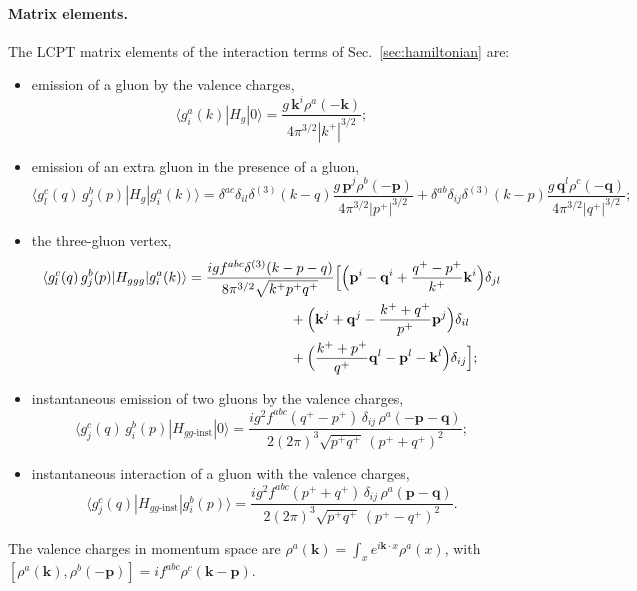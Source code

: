 \documentclass[aps,prd,onecolumn,superscriptaddress,nofootinbib,floatfix,longbibliography,11pt]{revtex4-2}
\numberwithin{equation}{section}
\begin{document}
\paragraph*{Matrix elements.} The LCPT matrix elements of the interaction terms of Sec.~\ref{sec:hamiltonian} are:
\begin{itemize}
\item emission of a gluon by the valence charges,
\begin{equation}
\langle g^a_i(k)|H_g|0\rangle=\frac{g\,\mathbf k^i\rho^a(-\mathbf k)}{4\pi^{3/2}|k^+|^{3/2}};
\label{eq:m1}
\end{equation}
\item emission of an extra gluon in the presence of a gluon,
\begin{equation}
\langle g^c_l(q)\,g^b_j(p)|H_g|g^a_i(k)\rangle=\delta^{ac}\delta_{il}\delta^{(3)}(k-q)\frac{g\,\mathbf p^j\rho^b(-\mathbf p)}{4\pi^{3/2}|p^+|^{3/2}}+\delta^{ab}\delta_{ij}\delta^{(3)}(k-p)\frac{g\,\mathbf q^l\rho^c(-\mathbf q)}{4\pi^{3/2}|q^+|^{3/2}};
\label{eq:m2}
\end{equation}
\item the three-gluon vertex,
\begin{align}
\langle g^c_l(q)\,g^b_j(p)|H_{ggg}|g^a_i(k)\rangle={}&\frac{igf^{abc}\delta^{(3)}(k-p-q)}{8\pi^{3/2}\sqrt{k^+p^+q^+}}\Big[\Big(\mathbf p^i-\mathbf q^i+\frac{q^+-p^+}{k^+}\mathbf k^i\Big)\delta_{jl}\notag\\
&\hspace{6em}+\Big(\mathbf k^j+\mathbf q^j-\frac{k^++q^+}{p^+}\mathbf p^j\Big)\delta_{il}\notag\\
&\hspace{6em}+\Big(\frac{k^++p^+}{q^+}\mathbf q^l-\mathbf p^l-\mathbf k^l\Big)\delta_{ij}\Big];
\label{eq:m3}
\end{align}
\item instantaneous emission of two gluons by the valence charges,
\begin{equation}
\langle g^c_j(q)\,g^b_i(p)|H_{gg\text{-inst}}|0\rangle=\frac{ig^2f^{abc}(q^+-p^+)\,\delta_{ij}\,\rho^a(-\mathbf p-\mathbf q)}{2(2\pi)^3\sqrt{p^+q^+}\,(p^++q^+)^2};
\label{eq:m4}
\end{equation}
\item instantaneous interaction of a gluon with the valence charges,
\begin{equation}
\langle g^c_j(q)|H_{gg\text{-inst}}|g^b_i(p)\rangle=\frac{ig^2f^{abc}(p^++q^+)\,\delta_{ij}\,\rho^a(\mathbf p-\mathbf q)}{2(2\pi)^3\sqrt{p^+q^+}\,(p^+-q^+)^2}.
\label{eq:m5}
\end{equation}
\end{itemize}
The valence charges in momentum space are $\rho^a(\mathbf k)=\int_xe^{i\mathbf k\cdot x}\rho^a(x)$, with $[\rho^a(\mathbf k),\rho^b(-\mathbf p)]=if^{abc}\rho^c(\mathbf k-\mathbf p)$.
\end{document}
